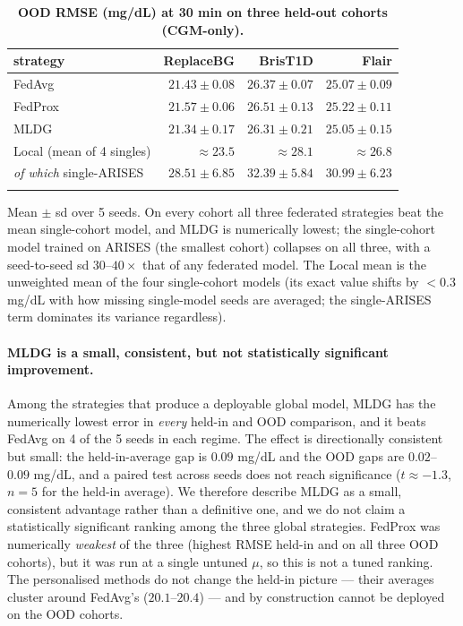 \documentclass[10pt,letterpaper]{article}
\newlength\savedwidth
\newcommand\thickhline{\noalign{\global\savedwidth\arrayrulewidth\global\arrayrulewidth 2pt}%
\hline
\noalign{\global\arrayrulewidth\savedwidth}}
\begin{document}
\begin{table}[!ht]
\centering
\captionsetup{justification=centering,singlelinecheck=on}
\caption{\bf OOD RMSE (mg/dL) at 30 min on three held-out cohorts (CGM-only).}
\label{tab:ood}
\begin{tabular}{lrrr}
\thickhline
strategy & ReplaceBG & BrisT1D & Flair \\
\hline
FedAvg  & $21.43 \pm 0.08$ & $26.37 \pm 0.07$ & $25.07 \pm 0.09$ \\
FedProx & $21.57 \pm 0.06$ & $26.51 \pm 0.13$ & $25.22 \pm 0.11$ \\
MLDG    & $\mathbf{21.34 \pm 0.17}$ & $\mathbf{26.31 \pm 0.21}$ & $\mathbf{25.05 \pm 0.15}$ \\
\hline
Local (mean of 4 singles) & ${\approx}23.5$ & ${\approx}28.1$ & ${\approx}26.8$ \\
\;\emph{of which} single-ARISES & $28.51 \pm 6.85$ & $32.39 \pm 5.84$ & $30.99 \pm 6.23$ \\
\thickhline
\end{tabular}
\begin{center}
{\small Mean $\pm$ sd over 5 seeds. On every cohort all three federated
strategies beat the mean single-cohort model, and MLDG is numerically lowest;
the single-cohort model trained on ARISES (the smallest cohort) collapses on all
three, with a seed-to-seed sd $30$--$40\times$ that of any federated model. The
Local mean is the unweighted mean of the four single-cohort models (its exact
value shifts by $<0.3$ mg/dL with how missing single-model seeds are averaged;
the single-ARISES term dominates its variance regardless).}
\end{center}
\end{table}

\paragraph{MLDG is a small, consistent, but not statistically significant
improvement.} Among the strategies that produce a deployable global model, MLDG
has the numerically lowest error in \emph{every} held-in and OOD comparison, and
it beats FedAvg on 4 of the 5 seeds in each regime. The effect is directionally
consistent but small: the held-in-average gap is $0.09$ mg/dL and the OOD gaps
are $0.02$--$0.09$ mg/dL, and a paired test across seeds does not reach
significance ($t \approx -1.3$, $n=5$ for the held-in average). We therefore
describe MLDG as a small, consistent advantage rather than a definitive one, and
we do not claim a statistically significant ranking among the three global
strategies. FedProx was numerically \emph{weakest} of the three (highest RMSE
held-in and on all three OOD cohorts), but it was run at a single untuned $\mu$,
so this is not a tuned ranking. The personalised methods do not change the
held-in picture --- their averages cluster around FedAvg's ($20.1$--$20.4$) ---
and by construction cannot be deployed on the OOD cohorts.
\end{document}
